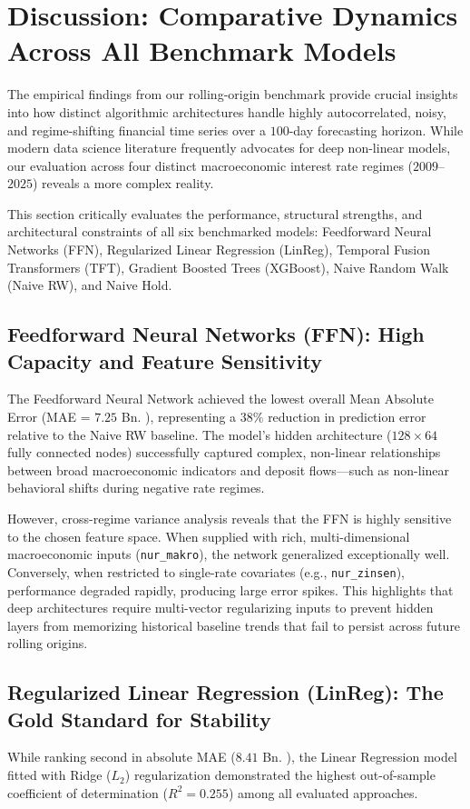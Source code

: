 \section{Discussion: Comparative Dynamics Across All Benchmark Models}
\label{sec:discussion}

The empirical findings from our rolling-origin benchmark provide crucial insights into how distinct algorithmic architectures handle highly autocorrelated, noisy, and regime-shifting financial time series over a $100$-day forecasting horizon. While modern data science literature frequently advocates for deep non-linear models, our evaluation across four distinct macroeconomic interest rate regimes ($2009$--$2025$) reveals a more complex reality. 

This section critically evaluates the performance, structural strengths, and architectural constraints of all six benchmarked models: Feedforward Neural Networks (FFN), Regularized Linear Regression (LinReg), Temporal Fusion Transformers (TFT), Gradient Boosted Trees (XGBoost), Naive Random Walk (Naive RW), and Naive Hold.

\subsection{Feedforward Neural Networks (FFN): High Capacity and Feature Sensitivity}
The Feedforward Neural Network achieved the lowest overall Mean Absolute Error (MAE = $7.25$ Bn. \texteuro), representing a $38\%$ reduction in prediction error relative to the Naive RW baseline. The model's hidden architecture ($128 \times 64$ fully connected nodes) successfully captured complex, non-linear relationships between broad macroeconomic indicators and deposit flows—such as non-linear behavioral shifts during negative rate regimes.

However, cross-regime variance analysis reveals that the FFN is highly sensitive to the chosen feature space. When supplied with rich, multi-dimensional macroeconomic inputs (\texttt{nur\_makro}), the network generalized exceptionally well. Conversely, when restricted to single-rate covariates (e.g., \texttt{nur\_zinsen}), performance degraded rapidly, producing large error spikes. This highlights that deep architectures require multi-vector regularizing inputs to prevent hidden layers from memorizing historical baseline trends that fail to persist across future rolling origins.

\subsection{Regularized Linear Regression (LinReg): The Gold Standard for Stability}
While ranking second in absolute MAE ($8.41$ Bn. \texteuro), the Linear Regression model fitted with Ridge ($L_2$) regularization demonstrated the highest out-of-sample coefficient of determination ($R^2 = 0.255$) among all evaluated approaches. 

